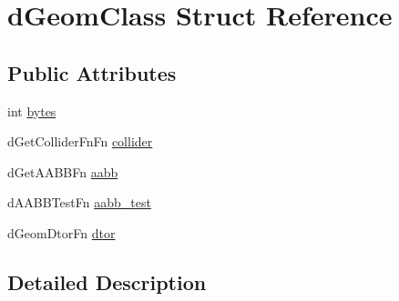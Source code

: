 \hypertarget{structd_geom_class}{
\section{dGeomClass Struct Reference}
\label{structd_geom_class}
}
\subsection*{Public Attributes}
\begin{DoxyCompactItemize}
\item 
int \hyperlink{structd_geom_class_a78e7339b5a0f516f666e3eacb52f8fb3}{bytes}
\item 
dGetColliderFnFn \hyperlink{structd_geom_class_a8b3051346eaeb3a7ff0b719d7ad2fef2}{collider}
\item 
dGetAABBFn \hyperlink{structd_geom_class_a4582f1134d770c6a62886cf0066977fa}{aabb}
\item 
dAABBTestFn \hyperlink{structd_geom_class_ab53eae306dae4cf9dd29faac7dac1e8e}{aabb\_\-test}
\item 
dGeomDtorFn \hyperlink{structd_geom_class_ac4563370026525bf962a3ba32886c78e}{dtor}
\end{DoxyCompactItemize}


\subsection{Detailed Description}


